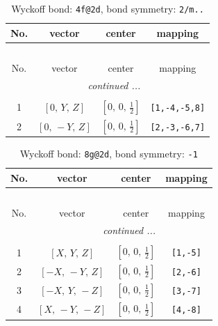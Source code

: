 \documentclass[fleqn,8pt]{jsarticle}
\begin{document}
\begin{longtable}{cccc}
\caption{Wyckoff bond: {\tt 4f@2d}, bond symmetry: {\tt 2/m..}}
 \\
 \hline \hline
No. & vector & center & mapping \\ \hline \endfirsthead

\multicolumn{3}{l}{\tablename\ \thetable{}} \\
 \hline \hline
No. & vector & center & mapping \\ \hline \endhead

 \hline \hline
\multicolumn{3}{r}{\footnotesize\it continued ...} \\ \endfoot

 \hline \hline
\multicolumn{3}{r}{} \\ \endlastfoot

1 & $\left[ 0,\, Y,\, Z \right]$ & $\left[ 0,\, 0,\, \frac{1}{2} \right]$ & {\tt [1,-4,-5,8]} \\ \hline
2 & $\left[ 0,\, - Y,\, Z \right]$ & $\left[ 0,\, 0,\, \frac{1}{2} \right]$ & {\tt [2,-3,-6,7]} \\
\end{longtable}
\renewcommand{\arraystretch}{1.2}
\begin{longtable}{cccc}
\caption{Wyckoff bond: {\tt 8g@2d}, bond symmetry: {\tt -1}}
 \\
 \hline \hline
No. & vector & center & mapping \\ \hline \endfirsthead

\multicolumn{3}{l}{\tablename\ \thetable{}} \\
 \hline \hline
No. & vector & center & mapping \\ \hline \endhead

 \hline \hline
\multicolumn{3}{r}{\footnotesize\it continued ...} \\ \endfoot

 \hline \hline
\multicolumn{3}{r}{} \\ \endlastfoot

1 & $\left[ X,\, Y,\, Z \right]$ & $\left[ 0,\, 0,\, \frac{1}{2} \right]$ & {\tt [1,-5]} \\ \hline
2 & $\left[ - X,\, - Y,\, Z \right]$ & $\left[ 0,\, 0,\, \frac{1}{2} \right]$ & {\tt [2,-6]} \\ \hline
3 & $\left[ - X,\, Y,\, - Z \right]$ & $\left[ 0,\, 0,\, \frac{1}{2} \right]$ & {\tt [3,-7]} \\ \hline
4 & $\left[ X,\, - Y,\, - Z \right]$ & $\left[ 0,\, 0,\, \frac{1}{2} \right]$ & {\tt [4,-8]} \\
\end{longtable}
\end{document}
